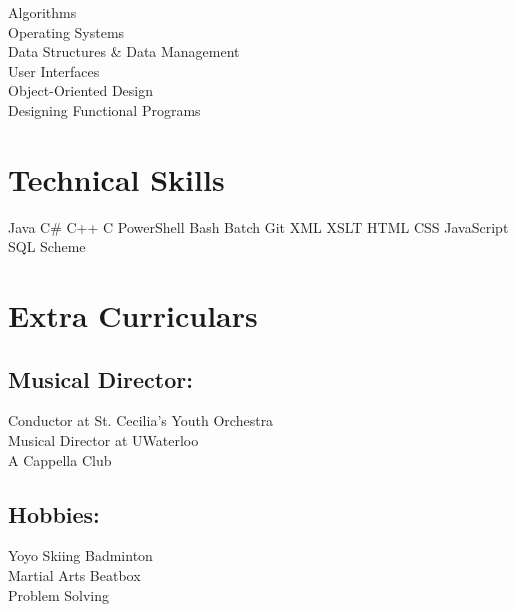 \documentclass[letterpaper]{kevin-resume} %
\begin{document}
\begin{minipage}[t]{0.30\textwidth}

Algorithms \\
Operating Systems \\
Data Structures \& Data Management \\
User Interfaces \\
Object-Oriented Design \\
Designing Functional Programs \\

\sectionspace %


\section{Technical Skills}

Java \textbullet{}
C\# \textbullet{} 
C++ \textbullet{} 
C \textbullet{}
PowerShell
Bash \textbullet{} 
Batch \textbullet{} 
Git \textbullet{} 
XML \textbullet{} 
XSLT
HTML \textbullet{} 
CSS \textbullet{} 
JavaScript \textbullet{} 
SQL
Scheme

\sectionspace %

\section{Extra Curriculars}
\subsection{Musical Director:}
\textbullet{} Conductor at St. Cecilia’s Youth Orchestra \\
\textbullet{} Musical Director at UWaterloo \\A Cappella Club
\sectionspace %
\subsection{Hobbies:}
Yoyo \textbullet{} 
Skiing \textbullet{} 
Badminton \\
Martial Arts \textbullet{} 
Beatbox \\
Problem Solving


\end{minipage} %
\end{document}
